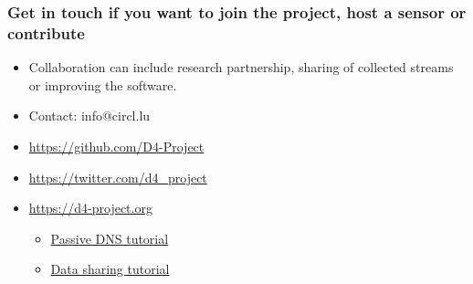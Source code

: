 \documentclass{beamer}
\begin{document}
\begin{frame}
\frametitle{Get in touch if you want to join the project, host a sensor or contribute}
\begin{itemize}
\item Collaboration can include research partnership, sharing of collected streams or improving the software.
\item Contact: info@circl.lu
\item \url{https://github.com/D4-Project}
\item \url{https://twitter.com/d4_project}
\item \url{https://d4-project.org}
\begin{itemize}
  \item
    \href{https://d4-project.org/2019/05/28/passive-dns-tutorial.html}{Passive DNS tutorial}
  \item
    \href{https://d4-project.org/2019/06/17/sharing-between-D4-sensors.html}{Data
      sharing tutorial}
\end{itemize}
\end{itemize}
\end{frame}
\end{document}
